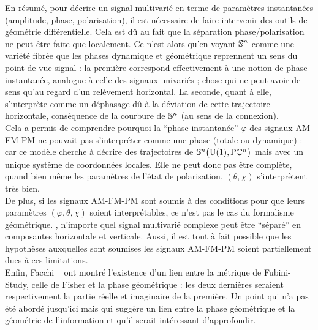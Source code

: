 En résumé, pour décrire un signal multivarié en terme de paramètres instantanées (amplitude, phase, polarisation), il est nécessaire de faire intervenir des outils de géométrie différentielle. Cela est dû au fait que la séparation phase/polarisation ne peut être faite que localement. 
Ce n'est alors qu'en voyant $\S{n}$ comme une variété fibrée que les phases dynamique et géométrique reprennent un sens du point de vue signal : la première correspond effectivement à une notion de phase instantanée, analogue à celle des signaux univariés ; chose qui ne peut avoir de sens qu'au regard d'un relèvement horizontal. La seconde, quant à elle, s'interprète comme un déphasage dû à la déviation de cette trajectoire horizontale, conséquence de la courbure de $\S{n}$ (au sens de la connexion).
\\

Cela a permis de comprendre pourquoi la ``phase instantanée'' $\varphi$ des signaux AM-FM-PM ne pouvait pas s'interpréter comme une phase (totale ou dynamique) : car ce modèle cherche à décrire des trajectoires de $\VFP$ mais avec un unique système de coordonnées locales. Elle ne peut donc pas être complète, quand bien même les paramètres de l'état de polarisation, $(\theta,\chi)$ s'interprètent très bien.
\\
De plus, si les signaux AM-FM-PM sont soumis à des conditions pour que leurs paramètres $(\varphi,\theta,\chi)$ soient interprétables, ce n'est pas le cas du formalisme géométrique. \Apriori, n'importe quel signal multivarié complexe peut être ``séparé'' en composantes horizontale et verticale. Aussi, il est tout à fait possible que les hypothèses auxquelles sont soumises les signaux AM-FM-PM soient partiellement dues à ces limitations.
\\

Enfin, Facchi \etal~\cite{facchi_classical_2010} ont montré l'existence d'un lien entre la métrique de Fubini-Study, celle de Fisher et la phase géométrique : les deux dernières  seraient respectivement la partie réelle et imaginaire de la première. Un point qui n'a pas été abordé jusqu'ici mais qui suggère un lien entre la phase géométrique et la géométrie de l'information et qu'il serait intéressant d'approfondir.
